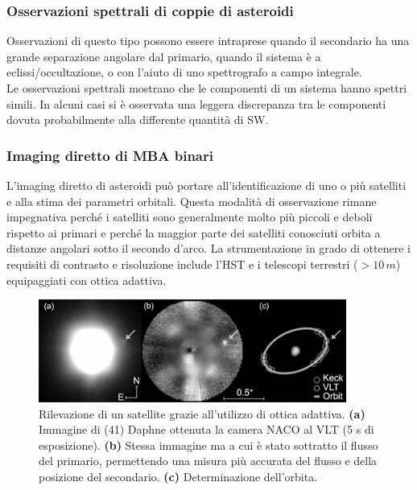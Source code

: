 \documentclass[a4paper,11pt,openright]{book}
\begin{document}
\subsubsection{Osservazioni spettrali di coppie di asteroidi}
Osservazioni di questo tipo possono essere intraprese quando il secondario ha una grande separazione angolare dal primario, quando il sistema è a eclissi/occultazione, o con l'aiuto di uno spettrografo a campo integrale.\\
Le osservazioni spettrali mostrano che le componenti di un sistema hanno spettri simili. In alcuni casi si è osservata una leggera discrepanza tra le componenti dovuta probabilmente alla differente quantità di SW.

\subsubsection{Imaging diretto di MBA binari}
L'imaging diretto di asteroidi può portare all'identificazione di uno o più satelliti e alla stima dei parametri orbitali. Questa modalità di osservazione rimane impegnativa perché i satelliti sono generalmente molto più piccoli e deboli rispetto ai primari e perché la maggior parte dei satelliti conosciuti orbita a distanze angolari sotto il secondo d'arco. La strumentazione in grado di ottenere i requisiti di contrasto e risoluzione include l'HST e i telescopi terrestri ($>10\,m$) equipaggiati con ottica adattiva.

\begin{figure}[!h]
    \centering
    \includegraphics[width=0.9\textwidth]{figure/binaries_direct_imaging.jpg}
    \caption[Rilevazione del satellite di (41) Daphne grazie all'uso dell'ottica adattiva.]{Rilevazione di un satellite grazie all'utilizzo di ottica adattiva. \textbf{(a)} Immagine di (41) Daphne ottenuta la camera NACO al VLT (5 s di esposizione). \textbf{(b)} Stessa immagine ma a cui è stato sottratto il flusso del primario, permettendo una misura più accurata del flusso e della posizione del secondario. \textbf{(c)} Determinazione dell'orbita. \citep{carry_ao_2009}}
    \label{fig:binaries_direct_imaging}
\end{figure}
\end{document}
